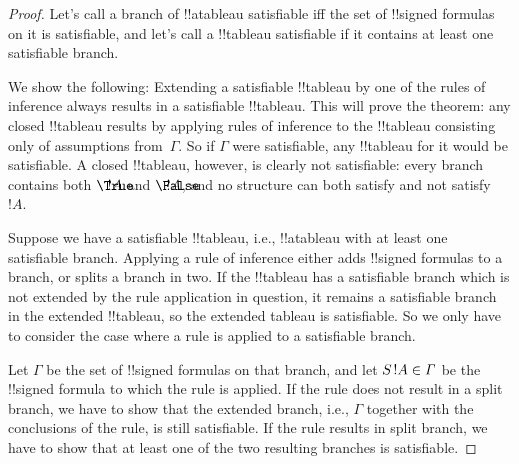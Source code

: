 \documentclass[../../../include/open-logic-section]{subfiles}
\begin{document}
\begin{proof}
Let's call a branch of !!a{tableau} satisfiable iff the set of
!!{signed formula}s on it is satisfiable, and let's call a !!{tableau}
satisfiable if it contains at least one satisfiable branch.

We show the following: Extending a satisfiable !!{tableau} by one of
the rules of inference always results in a satisfiable !!{tableau}.
This will prove the theorem: any closed !!{tableau} results by
applying rules of inference to the !!{tableau} consisting only of
assumptions from~$\Gamma$. So if $\Gamma$ were satisfiable, any
!!{tableau} for it would be satisfiable. A closed !!{tableau},
however, is clearly not satisfiable: every branch contains both
$\sFmla{\True}{!A}$ and $\sFmla{\False}{!A}$, and no structure can
both satisfy and not satisfy~$!A$.

Suppose we have a satisfiable !!{tableau}, i.e., !!a{tableau} with at
least one satisfiable branch. Applying a rule of inference either adds
!!{signed formula}s to a branch, or splits a branch in two. If the
!!{tableau} has a satisfiable branch which is not extended by the rule
application in question, it remains a satisfiable branch in the
extended !!{tableau}, so the extended tableau is satisfiable. So we
only have to consider the case where a rule is applied to a
satisfiable branch.

Let $\Gamma$ be the set of !!{signed formula}s on that branch, and
let $\sFmla{S}{!A} \in \Gamma$ be the !!{signed formula} to which the
rule is applied. If the rule does not result in a split branch, we
have to show that the extended branch, i.e., $\Gamma$ together with
the conclusions of the rule, is still satisfiable. If the rule results
in split branch, we have to show that at least one of the two
resulting branches is satisfiable.
  

\end{proof}
\end{document}
